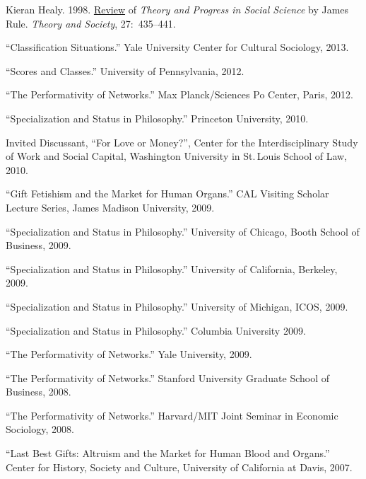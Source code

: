 \documentclass[11pt,oneside,a4paper,DIV=8]{scrartcl}
\renewcommand*{\section}[1]{\bigskip\marginnote{\sffamily\footnotesize\raggedright{#1}}\par}
\begin{document}
Kieran Healy. 1998. \href{http://www.kieranhealy.org/files/reviews/rule.pdf}{Review} of \emph{Theory and Progress in Social Science} by James Rule.  \emph{Theory
  and Society}, 27:~435--441.

 
 

\section{selected \\ invited talks \\ since 2007}



``Classification Situations.'' Yale University Center for Cultural Sociology, 2013.
 
``Scores and Classes.'' University of Pennsylvania, 2012.

``The Performativity of Networks.'' Max Planck/Sciences Po Center, Paris, 2012. 
 
``Specialization and Status in Philosophy.'' Princeton University, 2010. 

Invited Discussant, ``For Love or Money?'', Center for the Interdisciplinary Study of Work and Social Capital, Washington University in St.\,Louis School of Law, 2010. 

``Gift Fetishism and the Market for Human Organs.'' CAL Visiting Scholar Lecture Series, James Madison University, 2009. 

``Specialization and Status in Philosophy.'' University of Chicago, Booth School of Business, 2009. 

``Specialization and Status in Philosophy.'' University of California, Berkeley, 2009. 

``Specialization and Status in Philosophy.'' University of Michigan, ICOS, 2009. 

``Specialization and Status in Philosophy.'' Columbia University 2009. 

``The Performativity of Networks.'' Yale University, 2009. 

``The Performativity of Networks.'' Stanford University Graduate School of Business, 2008. 

``The Performativity of Networks.'' Harvard/MIT Joint Seminar in Economic Sociology, 2008. 

``Last Best Gifts: Altruism and the Market for Human Blood and Organs.'' Center for History, Society and Culture, University of California at Davis, 2007. 
\end{document}

